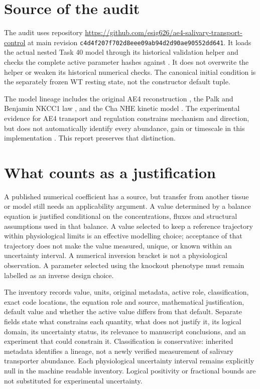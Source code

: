 \newcommand{\InventoryCount}{137}
\newcommand{\ActiveCount}{109}
\newcommand{\SensitivitySourceCommit}{f783785a863440df459e9c5530beba4c7eb59110}

\section{Source of the audit}
The audit uses repository \url{https://github.com/esig626/ae4-salivary-transport-control} at main revision \texttt{c4d4f207f702d8eee09ab94d2d90ae90552dd641}. It loads the actual nested Task 40 model through its historical validation helper and checks the complete active parameter hashes against . It does not overwrite the helper or weaken its historical numerical checks. The canonical initial condition is the separately frozen WT resting state, not the constructor default tuple.

The model lineage includes the original AE4 reconstruction \citep{p43VeraSiguenza2018}, the Palk and Benjamin NKCC1 law \citep{p43Palk2010,p43Benjamin1997}, and the Cha NHE kinetic model \citep{p43Cha2009}. The experimental evidence for AE4 transport and regulation constrains mechanism and direction, but does not automatically identify every abundance, gain or timescale in this implementation \citep{p43Pena2015,p43Pena2016,p43Pena2021,p43Catalan2025}. This report preserves that distinction.

\section{What counts as a justification}
A published numerical coefficient has a source, but transfer from another tissue or model still needs an applicability argument. A value determined by a balance equation is justified conditional on the concentrations, fluxes and structural assumptions used in that balance. A value selected to keep a reference trajectory within physiological limits is an effective modelling choice; acceptance of that trajectory does not make the value measured, unique, or known within an uncertainty interval. A numerical inversion bracket is not a physiological observation. A parameter selected using the knockout phenotype must remain labelled as an inverse design choice.

The inventory records value, units, original metadata, active role, classification, exact code locations, the equation role and source, mathematical justification, default value and whether the active value differs from that default. Separate fields state what constrains each quantity, what does not justify it, its logical domain, its uncertainty status, its relevance to manuscript conclusions, and an experiment that could constrain it. Classification is conservative: inherited metadata identifies a lineage, not a newly verified measurement of salivary transporter abundance. Each physiological uncertainty interval remains explicitly null in the machine readable inventory. Logical positivity or fractional bounds are not substituted for experimental uncertainty.

